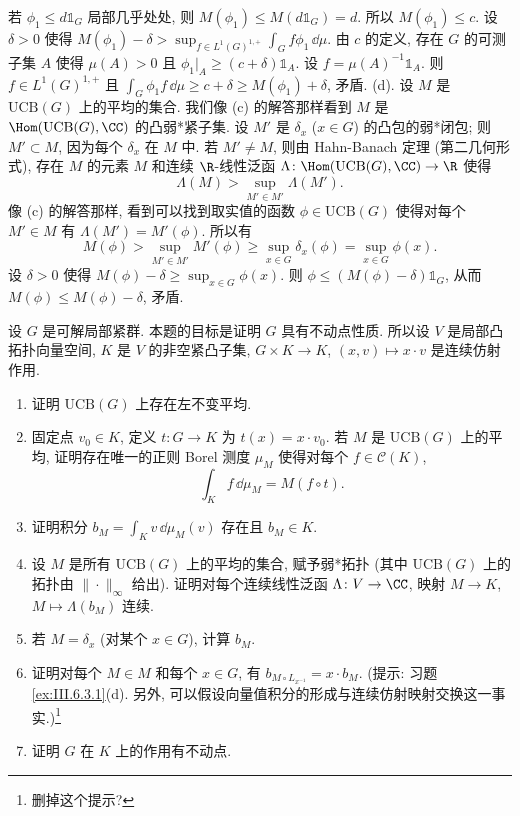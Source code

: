 \begin{solution}
\[\]
若 $\phi_1 \leq d\mathbb{1}_G$ 局部几乎处处, 则 $M(\phi_1) \leq M(d\mathbb{1}_G) = d$. 所以 $M(\phi_1) \leq c$. 设 $\delta > 0$ 使得 $M(\phi_1) - \delta > \sup_{f \in L^1(G)^{1,+}}\int_G f\phi_1\,\dd\mu$. 由 $c$ 的定义, 存在 $G$ 的可测子集 $A$ 使得 $\mu(A) > 0$ 且 $\phi_1|_A \geq (c + \delta)\mathbb{1}_A$. 设 $f = \mu(A)^{-1}\mathbb{1}_A$. 则 $f \in L^1(G)^{1,+}$ 且 $\int_G \phi_1f\,\dd\mu \geq c + \delta \geq M(\phi_1) + \delta$, 矛盾.
(d). 设 $M$ 是 $\mathrm{UCB}(G)$ 上的平均的集合. 我们像 (c) 的解答那样看到 $M$ 是 $\Hom(\mathrm{UCB}(G), \CC)$ 的凸弱*紧子集. 设 $M'$ 是 $\delta_x$ ($x \in G$) 的凸包的弱*闭包; 则 $M' \subset M$, 因为每个 $\delta_x$ 在 $M$ 中. 若 $M' \neq M$, 则由 Hahn-Banach 定理 (第二几何形式), 存在 $M$ 的元素 $M$ 和连续 $\R$-线性泛函 $\Lambda \colon \Hom(\mathrm{UCB}(G), \CC) \to \R$ 使得
\[
\Lambda(M) > \sup_{M' \in M'}\Lambda(M').
\]
像 (c) 的解答那样, 看到可以找到取实值的函数 $\phi \in \mathrm{UCB}(G)$ 使得对每个 $M' \in M$ 有 $\Lambda(M') = M'(\phi)$. 所以有
\[
M(\phi) > \sup_{M' \in M'}M'(\phi) \geq \sup_{x \in G}\delta_x(\phi) = \sup_{x \in G}\phi(x).
\]
设 $\delta > 0$ 使得 $M(\phi) - \delta \geq \sup_{x \in G}\phi(x)$. 则 $\phi \leq (M(\phi) - \delta)\mathbb{1}_G$, 从而 $M(\phi) \leq M(\phi) - \delta$, 矛盾.
\end{solution}

\begin{exercise}[可解群具有不动点性质]
\label{ex:III.6.3.2}
设 $G$ 是可解局部紧群. 本题的目标是证明 $G$ 具有不动点性质.
所以设 $V$ 是局部凸拓扑向量空间, $K$ 是 $V$ 的非空紧凸子集, $G \times K \to K$, $(x, v) \longmapsto x \cdot v$ 是连续仿射作用.
\begin{enumerate}
\item[(a)] 证明 $\mathrm{UCB}(G)$ 上存在左不变平均.
\item[(b)] 固定点 $v_0 \in K$, 定义 $t \colon G \to K$ 为 $t(x) = x \cdot v_0$. 若 $M$ 是 $\mathrm{UCB}(G)$ 上的平均, 证明存在唯一的正则 Borel 测度 $\mu_M$ 使得对每个 $f \in \mathcal{C}(K)$,
\[
\int_K f\,\dd\mu_M = M(f \circ t).
\]
\item[(c)] 证明积分 $b_M = \int_K v\,\dd\mu_M(v)$ 存在且 $b_M \in K$.
\item[(d)] 设 $M$ 是所有 $\mathrm{UCB}(G)$ 上的平均的集合, 赋予弱*拓扑 (其中 $\mathrm{UCB}(G)$ 上的拓扑由 $\|\cdot\|_{\infty}$ 给出). 证明对每个连续线性泛函 $\Lambda \colon V \to \CC$, 映射 $M \to K$, $M \longmapsto \Lambda(b_M)$ 连续.
\item[(e)] 若 $M = \delta_x$ (对某个 $x \in G$), 计算 $b_M$.
\item[(f)] 证明对每个 $M \in M$ 和每个 $x \in G$, 有 $b_{M \circ L_{x^{-1}}} = x \cdot b_M$. (提示: 习题 \ref{ex:III.6.3.1}(d). 另外, 可以假设向量值积分的形成与连续仿射映射交换这一事实.)\footnote{删掉这个提示?}
\item[(g)] 证明 $G$ 在 $K$ 上的作用有不动点.
\end{enumerate}
\end{exercise}

